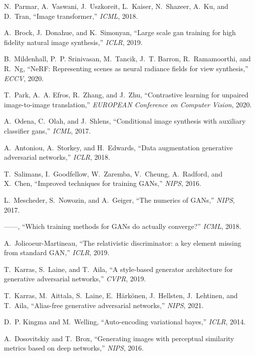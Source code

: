 \documentclass[lettersize,journal]{IEEEtran}
\begin{document}
\begin{thebibliography}{10}
N.~Parmar, A.~Vaswani, J.~Uszkoreit, L.~Kaiser, N.~Shazeer, A.~Ku, and D.~Tran,
  ``Image transformer,'' \emph{ICML}, 2018.

A.~Brock, J.~Donahue, and K.~Simonyan, ``Large scale gan training for high
  fidelity natural image synthesis,'' \emph{ICLR}, 2019.

B.~Mildenhall, P.~P. Srinivasan, M.~Tancik, J.~T. Barron, R.~Ramamoorthi, and
  R.~Ng, ``{NeRF}: Representing scenes as neural radiance fields for view
  synthesis,'' \emph{ECCV}, 2020.

T.~Park, A.~A. Efros, R.~Zhang, and J.~Zhu, ``Contrastive learning for unpaired
  image-to-image translation,'' \emph{EUROPEAN Conference on Computer Vision},
  2020.

A.~Odena, C.~Olah, and J.~Shlens, ``Conditional image synthesis with auxiliary
  classifier gans,'' \emph{ICML}, 2017.

A.~Antoniou, A.~Storkey, and H.~Edwards, ``Data augmentation generative
  adversarial networks,'' \emph{ICLR}, 2018.

T.~Salimans, I.~Goodfellow, W.~Zaremba, V.~Cheung, A.~Radford, and X.~Chen,
  ``Improved techniques for training {GANs},'' \emph{NIPS}, 2016.

L.~Mescheder, S.~Nowozin, and A.~Geiger, ``The numerics of {GANs},''
  \emph{NIPS}, 2017.

------, ``Which training methods for {GANs} do actually converge?''
  \emph{ICML}, 2018.

A.~{Jolicoeur-Martineau}, ``The relativistic discriminator: a key element
  missing from standard {GAN},'' \emph{ICLR}, 2019.

T.~Karras, S.~Laine, and T.~Aila, ``A style-based generator architecture for
  generative adversarial networks,'' \emph{CVPR}, 2019.

T.~Karras, M.~Aittala, S.~Laine, E.~H\"ark\"onen, J.~Hellsten, J.~Lehtinen, and
  T.~Aila, ``Alias-free generative adversarial networks,'' \emph{NIPS}, 2021.

D.~P. Kingma and M.~Welling, ``Auto-encoding variational bayes,'' \emph{ICLR},
  2014.

A.~Dosovitskiy and T.~Brox, ``Generating images with perceptual similarity
  metrics based on deep networks,'' \emph{NIPS}, 2016.


\end{thebibliography}
\end{document}
